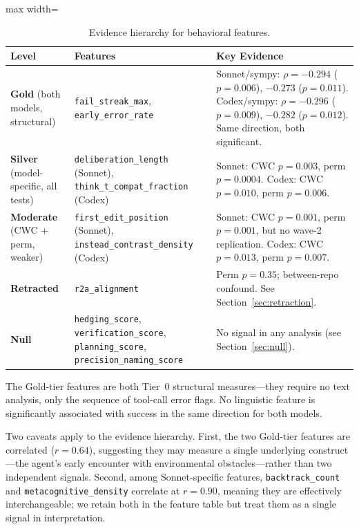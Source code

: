 \documentclass[11pt]{article}
\newcommand{\feat}[1]{\texttt{#1}}
\newcommand{\rtalign}{\feat{r2a\_alignment}}
\begin{document}
\begin{table}[t]
\centering
\caption{Evidence hierarchy for behavioral features.}
\label{tab:hierarchy}
\small
\begin{adjustbox}{max width=\textwidth}
\begin{tabular}{p{2.2cm}p{4.2cm}p{7.5cm}}
\toprule
\textbf{Level} & \textbf{Features} & \textbf{Key Evidence} \\
\midrule
\textbf{Gold} (both models, structural)
  & \feat{fail\_streak\_max}, \feat{early\_error\_rate}
  & Sonnet/sympy: $\rho = {-}0.294$ ($p = 0.006$), ${-}0.273$ ($p = 0.011$). Codex/sympy: $\rho = {-}0.296$ ($p = 0.009$), ${-}0.282$ ($p = 0.012$). Same direction, both significant. \\
\midrule
\textbf{Silver} (model-specific, all tests)
  & \feat{deliberation\_length} (Sonnet), \feat{think\_t\_compat\_fraction} (Codex)
  & Sonnet: CWC $p = 0.003$, perm $p = 0.0004$. Codex: CWC $p = 0.010$, perm $p = 0.006$. \\
\midrule
\textbf{Moderate} (CWC + perm, weaker)
  & \feat{first\_edit\_position} (Sonnet), \feat{instead\_contrast\_density} (Codex)
  & Sonnet: CWC $p = 0.001$, perm $p = 0.001$, but no wave-2 replication. Codex: CWC $p = 0.013$, perm $p = 0.007$. \\
\midrule
\textbf{Retracted}
  & \rtalign{}
  & Perm $p = 0.35$; between-repo confound. See Section~\ref{sec:retraction}. \\
\midrule
\textbf{Null}
  & \feat{hedging\_score}, \feat{verification\_score}, \feat{planning\_score}, \feat{precision\_naming\_score}
  & No signal in any analysis (see Section~\ref{sec:null}). \\
\bottomrule
\end{tabular}
\end{adjustbox}
\end{table}

The Gold-tier features are both Tier~0 structural measures---they require no text analysis, only the sequence of tool-call error flags.
No linguistic feature is significantly associated with success in the same direction for both models.

Two caveats apply to the evidence hierarchy.
First, the two Gold-tier features are correlated ($r = 0.64$), suggesting they may measure a single underlying construct---the agent's early encounter with environmental obstacles---rather than two independent signals.
Second, among Sonnet-specific features, \feat{backtrack\_count} and \feat{metacognitive\_density} correlate at $r = 0.90$, meaning they are effectively interchangeable; we retain both in the feature table but treat them as a single signal in interpretation.
\end{document}
